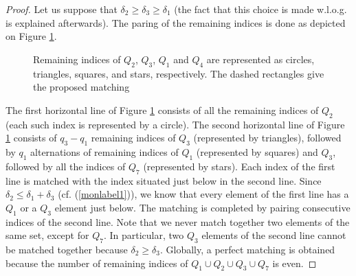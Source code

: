 \documentclass{article}
\begin{document}
\begin{proof}
Let us suppose that $\delta_2 \ge \delta_3 \ge \delta_1$ (the fact that this choice is made w.l.o.g. is explained afterwards). The paring of the remaining indices is done as depicted on Figure \ref{fig2}. 

\begin{figure}
\begin{center}

\end{center}

\caption{\label{fig2} Remaining indices of $Q_2$, $Q_3$,  $Q_1$ and $Q_4$ are represented as circles, triangles, squares, and stars, respectively. The dashed rectangles give the proposed matching}
\end{figure}



The first horizontal line of Figure \ref{fig2} consists of all the remaining indices of $Q_2$ (each such index is represented by a circle). The second horizontal line of Figure \ref{fig2} consists of $q_3-q_1$ remaining indices of $Q_3$ (represented by triangles), followed by $q_1$ alternations of remaining indices of $Q_1$ (represented by squares) and $Q_3$, followed by all the indices of $Q_7$ (represented by stars). Each index of the first line is matched with the index situated just below in the second line. Since $\delta_2 \le \delta_1+\delta_3$ (cf. (\ref{monlabel1})), we know that every element of the first line has a $Q_1$ or a $Q_3$ element just below. The matching is completed by pairing consecutive indices of the second line. Note that we never match together two elements of the same set, except for $Q_7$. In particular, two $Q_3$ elements of the second line cannot be matched together because $\delta_2 \ge \delta_3$.  Globally, a perfect matching is obtained because the number of remaining indices of $Q_1\cup Q_2 \cup Q_3 \cup Q_7$ is even. 


\end{proof}
\end{document}
